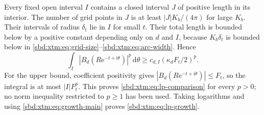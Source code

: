 \documentclass[11pt,a4paper]{article}
\theoremstyle{definition}
\newcommand{\e}{\mathrm e}
\newcommand{\ii}{\mathrm i}
\newcommand{\dd}{\,\mathrm d}
\begin{document}
Every fixed open interval $I$ contains a closed interval $J$ of positive
length in its interior. The number of grid points in $J$ is at least
$|J|K_b/(4\pi)$ for large $K_b$. Their intervals of radius $\delta_t$ lie in
$I$ for small $t$. Their total length is bounded below by a positive
constant depending only on $d$ and $I$, because $K_b\delta_t$ is bounded
below in \eqref{sbd:xtm:eq:grid-size}--\eqref{sbd:xtm:eq:arc-width}. Hence
\[
 \int_I|B_d(R\e^{-t+\ii\theta})|^p\dd\theta
 \ge c_{d,I}(\kappa_dF_t/2)^p.
\]
For the upper bound, coefficient positivity gives
$|B_d(R\e^{-t+\ii\theta})|\le F_t$, so the integral is at most $|I|F_t^p$.
This proves \eqref{sbd:xtm:eq:lp-comparison} for every $p>0$; no norm
inequality restricted to $p\ge1$ has been used. Taking logarithms and using
\eqref{sbd:xtm:eq:growth-main} proves \eqref{sbd:xtm:eq:lp-growth}.
\end{document}
